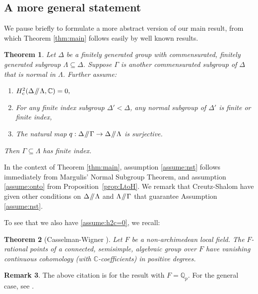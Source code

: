 \documentclass[JEP,XML,SOM,Unicode,published]{cedram}
\newcommand{\sslash}{\mathbin{\mkern-3mu /\mkern-5mu/ \mkern-3mu}}
\newcommand{\bbC}{\ensuremath{\mathbb{C}}}
\newcommand{\bbQ}{\ensuremath{\mathbb{Q}}}
\newtheorem{thm}{Theorem}[section]
\theoremstyle{definition}
\newtheorem{rem}[thm]{Remark}
\begin{document}
\subsection{A more general statement}
\label{subsec:generalversion}

We pause briefly to formulate a more abstract version of our main result, from which Theorem \ref{thm:main} follows easily by well known results.

\begin{thm}\label{thm:gen}
Let $\Delta$ be a finitely generated group with commensurated, finitely generated subgroup $\Lambda\subseteq \Delta$. Suppose $\Gamma$ is another commensurated subgroup of $\Delta$ that is normal in $\Lambda$. Further assume:
\begin{enumerate}
\item\label{assume:h2c=0} $H^2_c(\Delta\sslash \Lambda, \bbC)=0,$ 
\item\label{assume:nst} For any finite index subgroup $\Delta'<\Delta$, any normal subgroup of $\Delta'$ is finite or finite index, 
\item\label{assume:onto}
The natural map $q: \Delta\sslash\Gamma \to \Delta\sslash\Lambda$ is surjective.
\end{enumerate}
Then $\Gamma\subseteq\Lambda$ has finite index.
\end{thm}

In the context of Theorem \ref{thm:main}, assumption \eqref{assume:nst} follows immediately from Margulis' Normal Subgroup Theorem, and assumption \eqref{assume:onto} from Proposition~\ref{prop:LtoH}. We remark that Creutz-Shalom \cite{creutz-shalom} have given other conditions on $\Delta\sslash\Lambda$ and $\Lambda\sslash\Gamma$ that guarantee Assumption \eqref{assume:nst}.

To see that we also have \eqref{assume:h2c=0}, we recall:

\begin{thm}[{Casselman-Wigner \cite[Cor.\,2]{casselman-wigner}}]
\label{CW}
Let $F$ be a non-archimedean local field. The $F$-rational points of a connected, semisimple, algebraic group over $F$ have vanishing continuous cohomology (with $\bbC$-coefficients) in positive degrees.
\end{thm}

\begin{rem}\label{rem:any-field}
The above citation is for the result with $F=\bbQ_p$. For the general case, see \cite[Rem.\,(2), p.\,210]{casselman-wigner}.
\end{rem}
\end{document}
